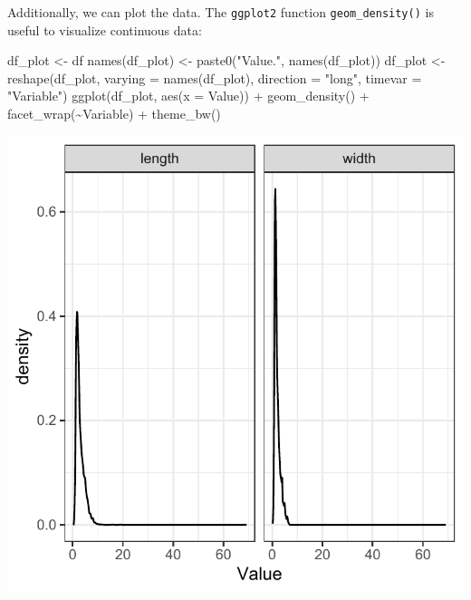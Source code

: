 \documentclass[
  man,floatsintext]{apa6}
\newenvironment{Shaded}{\begin{snugshade}}{\end{snugshade}}
\newcommand{\AttributeTok}[1]{\textcolor[rgb]{0.77,0.63,0.00}{#1}}
\newcommand{\FunctionTok}[1]{\textcolor[rgb]{0.00,0.00,0.00}{#1}}
\newcommand{\NormalTok}[1]{#1}
\newcommand{\OtherTok}[1]{\textcolor[rgb]{0.56,0.35,0.01}{#1}}
\newcommand{\SpecialCharTok}[1]{\textcolor[rgb]{0.00,0.00,0.00}{#1}}
\newcommand{\StringTok}[1]{\textcolor[rgb]{0.31,0.60,0.02}{#1}}
\begin{document}
Additionally, we can plot the data.
The \texttt{ggplot2} function \texttt{geom\_density()} is useful to visualize continuous data:

\begin{Shaded}
\begin{Highlighting}[]
\NormalTok{df\_plot }\OtherTok{\textless{}{-}}\NormalTok{ df}
\FunctionTok{names}\NormalTok{(df\_plot) }\OtherTok{\textless{}{-}} \FunctionTok{paste0}\NormalTok{(}\StringTok{"Value."}\NormalTok{, }\FunctionTok{names}\NormalTok{(df\_plot))}
\NormalTok{df\_plot }\OtherTok{\textless{}{-}} \FunctionTok{reshape}\NormalTok{(df\_plot, }\AttributeTok{varying =} \FunctionTok{names}\NormalTok{(df\_plot), }\AttributeTok{direction =} \StringTok{"long"}\NormalTok{,}
    \AttributeTok{timevar =} \StringTok{"Variable"}\NormalTok{)}
\FunctionTok{ggplot}\NormalTok{(df\_plot, }\FunctionTok{aes}\NormalTok{(}\AttributeTok{x =}\NormalTok{ Value)) }\SpecialCharTok{+} \FunctionTok{geom\_density}\NormalTok{() }\SpecialCharTok{+} \FunctionTok{facet\_wrap}\NormalTok{(}\SpecialCharTok{\textasciitilde{}}\NormalTok{Variable) }\SpecialCharTok{+}
    \FunctionTok{theme\_bw}\NormalTok{()}
\end{Highlighting}
\end{Shaded}

\includegraphics{appendices/plot_gmm_desc.pdf}
\end{document}
